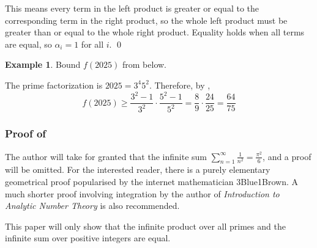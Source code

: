 \documentclass[a4paper, 12pt]{article}
\theoremstyle{definition}
\newtheorem{example}{Example}
\begin{document}
This means every term in the left product is greater or equal to the corresponding term in the right product,
so the whole left product must be greater than or equal to the whole right product.
Equality holds when all terms are equal, so $\alpha_i=1$ for all $i$.
\qed\vspace{1em}

\vspace{1em}\begin{example}
  Bound $f(2025)$ from below.

  The prime factorization is $2025 = 3^4 5^2$.
  Therefore, by \textbf{},
  \[f(2025) \geq \frac{3^2-1}{3^2}\cdot \frac{5^2-1}{5^2} = \frac{8}{9}\cdot\frac{24}{25}=\frac{64}{75}\]

\end{example}\vspace{1em}

\subsubsection*{Proof of }
The author will take for granted that the infinite sum $\sum_{n=1}^{\infty}\frac{1}{n^2}=\frac{\pi^2}{6}$,
and a proof will be omitted.
For the interested reader, there is a purely elementary geometrical proof\cite{basel}
popularised by the internet mathematician 3Blue1Brown\cite{Sanderson2018}.
A much shorter proof involving integration\cite{Apostol1983}
by the author of \textit{Introduction to Analytic Number Theory} is
also recommended.

This paper will only show that the infinite product over all primes and the infinite sum over positive integers are equal.
\end{document}
